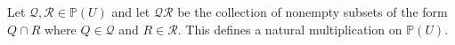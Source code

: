 Let $\mathcal{Q}, \mathcal{R} \in \mathbb{P}(U)$ and let $\mathcal{Q}\mathcal{R}$ be the collection of nonempty subsets of the form $Q \cap R$ where $Q \in \mathcal{Q}$ and $R \in \mathcal{R}$. This defines a natural multiplication on $\mathbb{P}(U)$.
